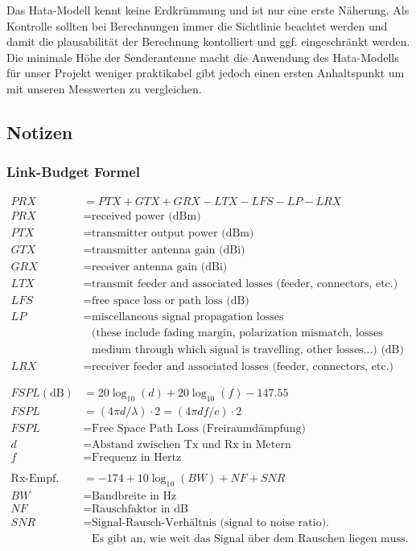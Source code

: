 \documentclass[12pt,a4paper]{article}
\begin{document}
Das Hata-Modell kennt keine Erdkrümmung und ist nur eine erste Näherung. Als Kontrolle sollten bei Berechnungen immer die Sichtlinie beachtet werden und damit die plausabilität der Berechnung kontolliert und ggf. eingeschränkt werden. Die minimale Höhe der Senderantenne macht die Anwendung des Hata-Modells für unser Projekt weniger praktikabel gibt jedoch einen ersten Anhaltspunkt um mit unseren Messwerten zu vergleichen.
\newpage
\subsection{Notizen}
\subsubsection{Link-Budget Formel}
\begin{align*}
PRX &= PTX + GTX + GRX - LTX - LFS - LP - LRX \\
PRX &= \text{received power (dBm)} \\
PTX &= \text{transmitter output power (dBm)} \\
GTX &= \text{transmitter antenna gain (dBi)} \\
GRX &= \text{receiver antenna gain (dBi)} \\
LTX &= \text{transmit feeder and associated losses (feeder, connectors, etc.) (dB)} \\
LFS &= \text{free space loss or path loss (dB)} \\
LP  &= \text{miscellaneous signal propagation losses} \\
    &\phantom{=} \text{(these include fading margin, polarization mismatch, losses associated with} \\
   &\phantom{=} \text{medium through which signal is travelling, other losses...) (dB)} \\
LRX &= \text{receiver feeder and associated losses (feeder, connectors, etc.) (d)B} \\ 
\\
\\
FSPL \mathrm{(dB)} &= 20\log_{10}(d) + 20\log_{10}(f) - 147.55 \\
FSPL &= (4\pi d/ \lambda) \cdot 2 = (4\pi df/c) \cdot 2 \\
FSPL &= \text{Free Space Path Loss (Freiraumdämpfung)} \\
d &= \text{Abstand zwischen Tx und Rx in Metern} \\
f &= \text{Frequenz in Hertz} \\
\\
\text{Rx-Empf.} &= -174 + 10\log_{10}(BW) + NF + SNR \\
BW &= \text{Bandbreite in Hz} \\
NF &= \text{Rauschfaktor in dB} \\
SNR &= \text{Signal-Rausch-Verhältnis (signal to noise ratio).} \\
    &\phantom{=} \text{Es gibt an, wie weit das Signal über dem Rauschen liegen muss.}\\
\end{align*}
\end{document}
